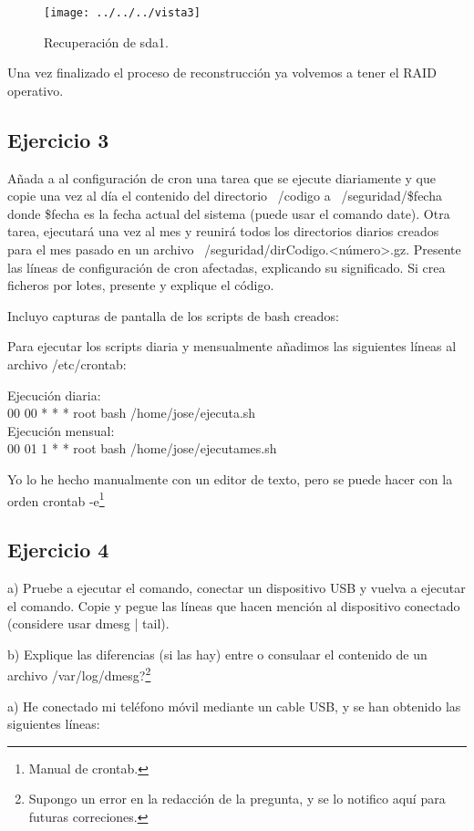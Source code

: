 \documentclass[a4paper, 11pt]{article} %
\begin{document}
\begin{figure}[htpb]
\centering
\texttt{[image: ../../../vista3]}
\caption{Recuperación de sda1.}
\end{figure}

Una vez finalizado el proceso de reconstrucción ya volvemos a tener el RAID operativo. 

\subsection{Ejercicio 3}
Añada a al configuración de cron una tarea que se ejecute diariamente y que copie una vez al día el contenido del directorio ~/codigo a ~/seguridad/\$fecha donde \$fecha es la fecha actual del sistema (puede usar el comando date). Otra tarea, ejecutará una vez al mes y reunirá todos los directorios diarios creados para el mes pasado en un archivo ~/seguridad/dirCodigo.<número>.gz. Presente las líneas de configuración de cron afectadas, explicando su significado. Si crea ficheros por lotes, presente y explique el código. 

Incluyo capturas de pantalla de los scripts de bash creados: 


Para ejecutar los scripts diaria y mensualmente añadimos las siguientes líneas al archivo /etc/crontab: 

Ejecución diaria:\\
00 00   * * *   root    bash /home/jose/ejecuta.sh\\
Ejecución mensual:\\
00 01   1 * *   root    bash /home/jose/ejecutames.sh

Yo lo he hecho manualmente con un editor de texto, pero se puede hacer con la orden crontab -e\footnote{Manual de crontab.}

\subsection{Ejercicio 4}
a) Pruebe a ejecutar el comando, conectar un dispositivo USB y vuelva a ejecutar el comando. Copie y pegue las líneas que hacen mención al dispositivo conectado (considere usar dmesg | tail). 

b) Explique las diferencias (si las hay) entre o consulaar el contenido de un archivo /var/log/dmesg?\footnote{Supongo un error en la redacción de la pregunta, y se lo notifico aquí para futuras correciones.}


a) He conectado mi teléfono móvil mediante un cable USB, y se han obtenido las siguientes líneas: 
\end{document}
